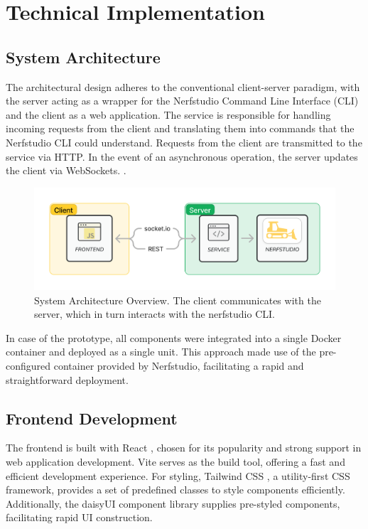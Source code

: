 %
\chapter{Technical Implementation}
\label{sec:system}

\section{System Architecture}
\label{sec:system:architecture}

The architectural design adheres to the conventional client-server paradigm, with the server acting as a wrapper for the Nerfstudio Command Line Interface (CLI) and the client as a web application.
The service is responsible for handling incoming requests from the client and translating them into commands that the Nerfstudio CLI could understand.
Requests from the client are transmitted to the service via HTTP.
In the event of an asynchronous operation, the server updates the client via WebSockets. .

\begin{figure}[htb]
	\includegraphics[width=\textwidth]{figures/architecture-1.png}
	\caption{System Architecture Overview. The client communicates with the server, which in turn interacts with the nerfstudio CLI.}
	\label{fig:system:example2}
\end{figure}

In case of the prototype, all components were integrated into a single Docker \cite{noauthor_docker_2022} container and deployed as a single unit.
This approach made use of the pre-configured container provided by Nerfstudio, facilitating a rapid and straightforward deployment.

\section{Frontend Development} 
\label{sec:system:frontend}

The frontend is built with React \cite{noauthor_react_nodate}, chosen for its popularity and strong support in web application development.
Vite \cite{noauthor_vite_nodate} serves as the build tool, offering a fast and efficient development experience.
For styling, Tailwind CSS \cite{noauthor_tailwind_2020}, a utility-first CSS framework, provides a set of predefined classes to style components efficiently.
Additionally, the daisyUI \cite{noauthor_daisyui_nodate} component library supplies pre-styled components, facilitating rapid UI construction.

